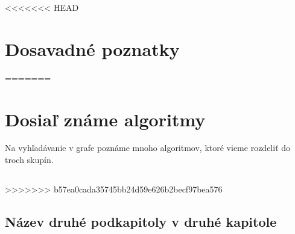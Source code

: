 <<<<<<< HEAD
\chapter{Dosavadné poznatky}
=======
\chapter{Dosiaľ známe algoritmy}
Na vyhľadávanie v grafe poznáme mnoho algoritmov, ktoré vieme rozdeliť do troch skupín.
\section{}


>>>>>>> b57ea0cada35745bb24d59e626b2becf97bea576


\section{Název druhé podkapitoly v druhé kapitole}

